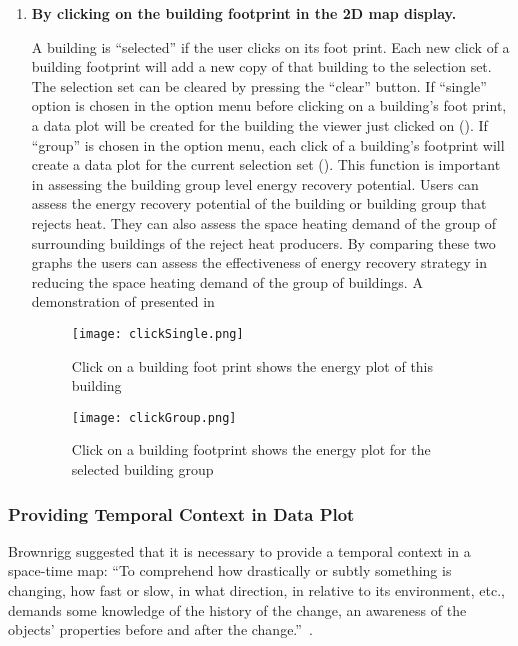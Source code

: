 \begin{enumerate}[1)]
\item \textbf{By clicking on the building footprint in the 2D map
    display.}

  A building is ``selected'' if the user clicks on its foot
  print. Each new click of a building footprint will add a new copy of
  that building to the selection set. The selection set can be cleared
  by pressing the ``clear'' button. If ``single'' option is chosen in
  the option menu before clicking on a building's foot print, a data
  plot will be created for the building the viewer just clicked on
  (). If ``group'' is chosen in the option menu,
  each click of a building's footprint will create a data plot for the
  current selection set (). This function is
  important in assessing the building group level energy recovery
  potential. Users can assess the energy recovery potential of the
  building or building group that rejects heat. They can also assess
  the space heating demand of the group of surrounding buildings of
  the reject heat producers. By comparing these two graphs the users
  can assess the effectiveness of energy recovery strategy in reducing
  the space heating demand of the group of buildings. A demonstration
  of presented in 
  
  \begin{figure}[h!]
    \centering
    \texttt{[image: clickSingle.png]}
    \caption[Show Plot for One Building]{Click on a building foot
      print shows the energy plot of this building}
    \label{fig:clickSingle}
  \end{figure}

  \begin{figure}[h!]
    \centering
    \texttt{[image: clickGroup.png]}
    \caption[Show Plot for a Group of Buildings]{Click on a building
      footprint shows the energy plot for the selected building group}
    \label{fig:clickGroup}
  \end{figure}

\end{enumerate}

\subsubsection{Providing Temporal Context in Data Plot}

Brownrigg suggested that it is necessary to provide a temporal context
in a space-time map: ``To comprehend how drastically or subtly
something is changing, how fast or slow, in what direction, in
relative to its environment, etc., demands some knowledge of the
history of the change, an awareness of the objects' properties before
and after the change.''~\cite{Brownrigg2005}.

